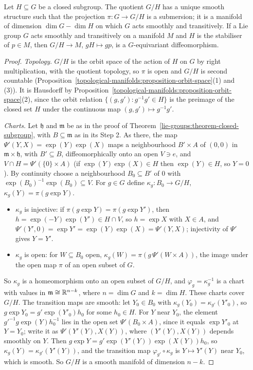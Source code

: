 \begin{theorem}\label{lie-groups:theorem-homogeneous}
Let $H \subseteq G$ be a closed subgroup. The quotient $G/H$ has a unique smooth structure such that the projection $\pi \colon G \to G/H$ is a submersion; it is a manifold of dimension $\dim G - \dim H$ on
which $G$ acts smoothly and transitively. If a Lie group $G$ acts smoothly and transitively on a manifold $M$ and $H$ is the stabiliser of $p \in M$, then $G/H \to M$, $gH \mapsto gp$, is a
$G$-equivariant diffeomorphism.
\end{theorem}

\begin{proof}
\emph{Topology.} $G/H$ is the orbit space of the action of $H$ on $G$ by right multiplication, with the quotient topology, so $\pi$ is open and $G/H$ is second
countable (Proposition~\ref{topological-manifolds:proposition-orbit-space}(1) and (3)). It is Hausdorff by
Proposition~\ref{topological-manifolds:proposition-orbit-space}(2), since the orbit relation $\{(g, g') : g^{-1}g' \in H\}$ is the preimage of the closed set $H$
under the continuous map $(g, g') \mapsto g^{-1}g'$.

\emph{Charts.} Let $\mathfrak{h}$ and $\mathfrak{m}$ be as in the proof of Theorem~\ref{lie-groups:theorem-closed-subgroup}, with $B \subseteq \mathfrak{m}$
as in its Step 2. As there, the map $\Psi'(Y, X) = \exp(Y)\exp(X)$ maps a neighbourhood $B' \times A$ of $(0, 0)$ in $\mathfrak{m} \times \mathfrak{h}$,
with $B' \subseteq B$, diffeomorphically onto an open $V \ni e$, and $V \cap H = \Psi'(\{0\} \times A)$ (if $\exp(Y)\exp(X) \in H$ then $\exp(Y) \in H$, so
$Y = 0$). By continuity choose a neighbourhood $B_0 \subseteq B'$ of $0$ with $\exp(B_0)^{-1}\exp(B_0) \subseteq V$. For $g \in G$ define
$\kappa_g \colon B_0 \to G/H$, $\kappa_g(Y) = \pi(g\exp Y)$.
\begin{itemize}
\item $\kappa_g$ is injective: if $\pi(g\exp Y) = \pi(g\exp Y')$, then $h = \exp(-Y)\exp(Y') \in H \cap V$, so $h = \exp X$ with $X \in A$, and
$\Psi'(Y', 0) = \exp Y' = \exp(Y)\exp(X) = \Psi'(Y, X)$; injectivity of $\Psi'$ gives $Y = Y'$.
\item $\kappa_g$ is open: for $W \subseteq B_0$ open, $\kappa_g(W) = \pi(g\,\Psi'(W \times A))$, the image under the open map $\pi$ of an open subset of $G$.
\end{itemize}
So $\kappa_g$ is a homeomorphism onto an open subset of $G/H$, and $\varphi_g = \kappa_g^{-1}$ is a chart with values in $\mathfrak{m} \cong \mathbb{R}^{n-k}$, where
$n = \dim G$ and $k = \dim H$. These charts cover $G/H$. The transition maps are smooth: let $Y_0 \in B_0$ with $\kappa_g(Y_0) = \kappa_{g'}(Y'_0)$, so
$g\exp Y_0 = g'\exp(Y'_0)h_0$ for some $h_0 \in H$. For $Y$ near $Y_0$, the element $g'^{-1}g\exp(Y)h_0^{-1}$ lies in the open set $\Psi'(B_0 \times A)$, since it
equals $\exp Y'_0$ at $Y = Y_0$; write it as $\Psi'(Y'(Y), X(Y))$, where $(Y'(Y), X(Y))$ depends smoothly on $Y$. Then
$g\exp Y = g'\exp(Y'(Y))\exp(X(Y))h_0$, so $\kappa_g(Y) = \kappa_{g'}(Y'(Y))$, and the transition map $\varphi_{g'} \circ \kappa_g$ is $Y \mapsto Y'(Y)$ near $Y_0$,
which is smooth. So $G/H$ is a smooth manifold of dimension $n - k$.


\end{proof}
